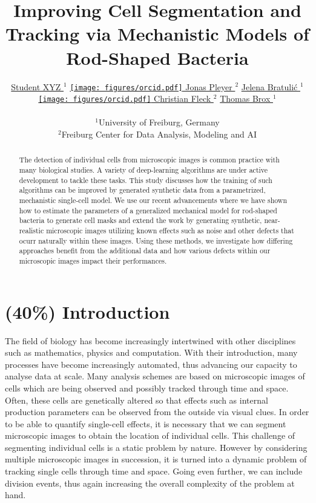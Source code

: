 \documentclass{article}
\title{Improving Cell Segmentation and Tracking via Mechanistic Models of
Rod-Shaped Bacteria}
\author{
    \href{https://orcid.org/0009-0001-0613-7978}{
        \hspace{1mm}Student XYZ
    }$^1$
    \href{https://orcid.org/0009-0001-0613-7978}{
        \texttt{[image: figures/orcid.pdf]}
        \hspace{1mm}Jonas Pleyer
    }$^2$
    \href{https://orcid.org/0009-0001-0613-7978}{
        \hspace{1mm}Jelena Bratulić
    }$^1$
	\href{https://orcid.org/0000-0002-6371-4495}{
        \texttt{[image: figures/orcid.pdf]}
        \hspace{1mm}Christian Fleck
    }$^2$
	\href{https://orcid.org/0000-0002-6371-4495}{
        \hspace{1mm}Thomas Brox
    }$^1$\\\\
    $^1$University of Freiburg, Germany\\
    $^2$Freiburg Center for Data Analysis, Modeling and AI\\
}
\begin{document}
\maketitle

\begin{abstract}
    The detection of individual cells from microscopic images is common practice with many
    biological studies.
    A variety of deep-learning algorithms are under active development to tackle these tasks.
    This study discusses how the training of such algorithms can be improved by generated synthetic
    data from a parametrized, mechanistic single-cell model.
    We use our recent advancements where we have shown how to estimate the parameters of a
    generalized mechanical model for rod-shaped bacteria to generate cell masks and extend the work
    by generating synthetic, near-realistic microscopic images utilizing known effects such as noise
    and other defects that ocurr naturally within these images.
    Using these methods, we investigate how differing approaches benefit from the additional data
    and how various defects within our microscopic images impact their performances.
\end{abstract}


\pagebreak
\renewcommand{\contentsname}{Table of Contents (remove before submission)}
\tableofcontents
\vfill
\pagebreak

\section{(40\%) Introduction}

The field of biology has become increasingly intertwined with other disciplines such as mathematics,
physics and computation.
With their introduction, many processes have become increasingly automated, thus advancing our
capacity to analyse data at scale.
Many analysis schemes are based on microscopic images of cells which are being observed and possibly
tracked through time and space.
Often, these cells are genetically altered so that effects such as internal production parameters
can be observed from the outside via visual clues.
In order to be able to quantify single-cell effects, it is necessary that we can segment microscopic
images to obtain the location of individual cells.
This challenge of segmenting individual cells is a static problem by nature.
However by considering multiple microscopic images in succession, it is turned into a dynamic
problem of tracking single cells through time and space.
Going even further, we can include division events, thus again increasing the overall complexity of
the problem at hand.
\end{document}
